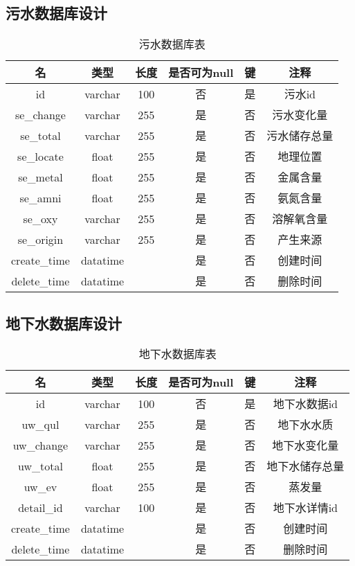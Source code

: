 \subsection{污水数据库设计}
\begin{table}[H]
	\centering
	\caption[污水数据]{污水数据库表}
	\begin{tabular}{cccccc}
		\toprule
		名            & 类型      & 长度 &是否可为null & 键 & 注释\\
		\midrule
		id            & varchar  & 100  & 否 & 是 & 污水id \\
		se\_change     & varchar  & 255  &是  & 否 & 污水变化量   \\
		se\_total      & varchar  & 255  &是  & 否 & 污水储存总量   \\
		se\_locate   & float    & 255  &是  & 否 & 地理位置 \\
		se\_metal    & float    & 255  &是  & 否 & 金属含量   \\
		se\_amni       & float    & 255  & 是 & 否 & 氨氮含量     \\
		se\_oxy    & varchar  & 255  & 是 & 否 & 溶解氧含量 \\
		se\_origin&varchar & 255 &是 & 否&产生来源\\
		create\_time  & datatime &      &是  & 否 & 创建时间   \\
		delete\_time  &datatime  &      & 是 & 否 & 删除时间   \\ 
		\bottomrule
	\end{tabular}
\end{table}
\subsection{地下水数据库设计}
\begin{table}[H]
	\centering
	\caption[地下水数据]{地下水数据库表}
	\begin{tabular}{cccccc}
		\toprule
		名            & 类型      & 长度 &是否可为null & 键 & 注释\\
		\midrule
		id            & varchar  & 100  & 否 & 是 & 地下水数据id \\
		uw\_qul     & varchar  & 255  &是  & 否 & 地下水水质   \\
		uw\_change      & varchar  & 255  &是  & 否 & 地下水变化量   \\
		uw\_total   & float    & 255  &是  & 否 & 地下水储存总量 \\
		uw\_ev       & float    & 255  & 是 & 否 & 蒸发量     \\
		detail\_id    & varchar  & 100  & 是 & 否 & 地下水详情id \\
		create\_time  & datatime &      &是  & 否 & 创建时间   \\
		delete\_time  &datatime  &      & 是 & 否 & 删除时间   \\ 
		\bottomrule
	\end{tabular}
\end{table}
